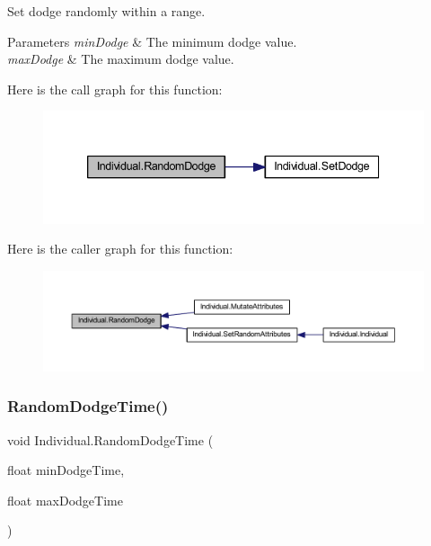 Set dodge randomly within a range. 


\begin{DoxyParams}{Parameters}
{\em min\+Dodge} & The minimum dodge value.\\
\hline
{\em max\+Dodge} & The maximum dodge value.\\
\hline
\end{DoxyParams}
Here is the call graph for this function\+:\nopagebreak
\begin{figure}[H]
\begin{center}
\leavevmode
\includegraphics[width=339pt]{class_individual_a75271d202126e53879bdb51a9fe65ef3_cgraph}
\end{center}
\end{figure}
Here is the caller graph for this function\+:\nopagebreak
\begin{figure}[H]
\begin{center}
\leavevmode
\includegraphics[width=350pt]{class_individual_a75271d202126e53879bdb51a9fe65ef3_icgraph}
\end{center}
\end{figure}
\mbox{\label{class_individual_a108e7c67d55c334bcc885e8dc5bb740b}} 
\subsubsection{\texorpdfstring{Random\+Dodge\+Time()}{RandomDodgeTime()}}
{\footnotesize\ttfamily void Individual.\+Random\+Dodge\+Time (\begin{DoxyParamCaption}\item[{float}]{min\+Dodge\+Time,  }\item[{float}]{max\+Dodge\+Time }\end{DoxyParamCaption})}



